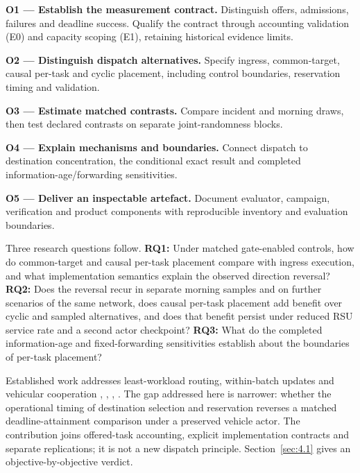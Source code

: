 \documentclass[12pt,a4paper]{article}
\begin{document}
\textbf{O1 --- Establish the measurement contract.} Distinguish offers, admissions, failures and deadline success. Qualify the contract through accounting validation (E0) and capacity scoping (E1), retaining historical evidence limits.

\textbf{O2 --- Distinguish dispatch alternatives.} Specify ingress, common-target, causal per-task and cyclic placement, including control boundaries, reservation timing and validation.

\textbf{O3 --- Estimate matched contrasts.} Compare incident and morning draws, then test declared contrasts on separate joint-randomness blocks.

\textbf{O4 --- Explain mechanisms and boundaries.} Connect dispatch to destination concentration, the conditional exact result and completed information-age/forwarding sensitivities.

\textbf{O5 --- Deliver an inspectable artefact.} Document evaluator, campaign, verification and product components with reproducible inventory and evaluation boundaries.

Three research questions follow. \textbf{RQ1:} Under matched gate-enabled controls, how do common-target and causal per-task placement compare with ingress execution, and what implementation semantics explain the observed direction reversal? \textbf{RQ2:} Does the reversal recur in separate morning samples and on further scenarios of the same network, does causal per-task placement add benefit over cyclic and sampled alternatives, and does that benefit persist under reduced RSU service rate and a second actor checkpoint? \textbf{RQ3:} What do the completed information-age and fixed-forwarding sensitivities establish about the boundaries of per-task placement?

Established work addresses least-workload routing, within-batch updates and vehicular cooperation \cite{ref14}, \cite{ref16}, \cite{ref7}, \cite{ref8}. The gap addressed here is narrower: whether the operational timing of destination selection and reservation reverses a matched deadline-attainment comparison under a preserved vehicle actor. The contribution joins offered-task accounting, explicit implementation contracts and separate replications; it is not a new dispatch principle. Section~\ref{sec:4.1} gives an objective-by-objective verdict.
\end{document}
